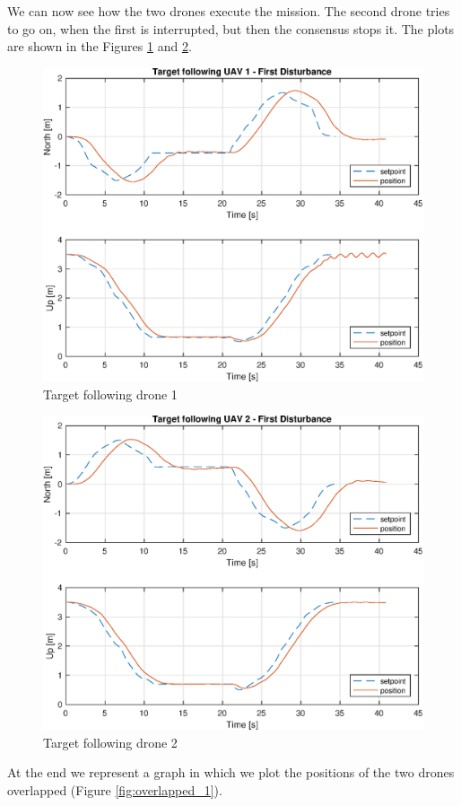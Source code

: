 We can now see how the two drones execute the mission. The second drone tries to
go on, when the first is interrupted, but then the consensus stops it. The plots are
shown in the Figures \ref{fig:following_1_1} and \ref{fig:following_2_1}.

\begin{figure}
\centering
\includegraphics[width=0.7\linewidth]{chapters/chapter-04/figures/following_1_1.eps}
\caption{Target following drone 1}
\label{fig:following_1_1}
\end{figure}

\begin{figure}
\centering
\includegraphics[width=0.7\linewidth]{chapters/chapter-04/figures/following_2_1.eps}
\caption{Target following drone 2}
\label{fig:following_2_1}
\end{figure}

At the end we represent a graph in which we plot the positions of the two drones overlapped
(Figure \ref{fig:overlapped_1}).

